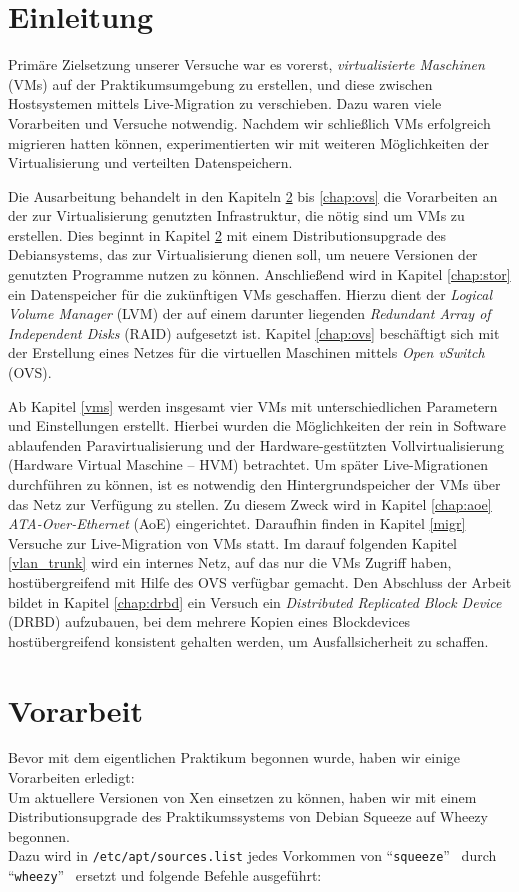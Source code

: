 \chapter{Einleitung}

Primäre Zielsetzung unserer Versuche war es vorerst, \emph{virtualisierte
Maschinen} (VMs) auf der Praktikumsumgebung zu erstellen, und diese
zwischen Hostsystemen mittels Live-Migration zu verschieben. Dazu waren viele
Vorarbeiten und Versuche notwendig. Nachdem wir schließlich VMs erfolgreich migrieren hatten können, experimentierten wir mit
weiteren Möglichkeiten der Virtualisierung und verteilten Datenspeichern.

Die Ausarbeitung behandelt in den Kapiteln \ref{chap:whezzy_ugprade} bis \ref{chap:ovs} die Vorarbeiten
an der zur Virtualisierung genutzten Infrastruktur, die nötig sind um VMs zu erstellen.
Dies beginnt in Kapitel \ref{chap:whezzy_ugprade} mit einem Distributionsupgrade des Debiansystems, 
das zur Virtualisierung dienen soll, um neuere Versionen der genutzten Programme nutzen zu können. Anschließend wird in Kapitel \ref{chap:stor} ein Datenspeicher für die zukünftigen VMs geschaffen. Hierzu dient der \emph{Logical Volume Manager} (LVM) der auf einem darunter liegenden \emph{Redundant Array of Independent Disks} (RAID) aufgesetzt ist. Kapitel \ref{chap:ovs} beschäftigt sich mit der Erstellung eines Netzes für die virtuellen Maschinen mittels \emph{Open vSwitch} (OVS).

Ab Kapitel \ref{vms} werden insgesamt vier VMs mit unterschiedlichen
Parametern und Einstellungen erstellt. Hierbei wurden die Möglichkeiten der rein in Software ablaufenden Paravirtualisierung und der Hardware-gestützten Vollvirtualisierung (Hardware Virtual Maschine -- HVM) betrachtet. Um später Live-Migrationen durchführen zu können, ist es notwendig den Hintergrundspeicher der VMs über das Netz zur Verfügung zu stellen. Zu diesem Zweck wird in Kapitel \ref{chap:aoe} \emph{ATA-Over-Ethernet} (AoE) eingerichtet. Daraufhin finden in Kapitel \ref{migr} Versuche zur Live-Migration von VMs statt. Im darauf folgenden Kapitel \ref{vlan_trunk} wird ein internes Netz, auf das nur die VMs Zugriff haben, hostübergreifend mit Hilfe des OVS verfügbar gemacht. Den Abschluss der Arbeit bildet in Kapitel \ref{chap:drbd} ein Versuch ein \emph{Distributed Replicated Block Device} (DRBD) aufzubauen, bei dem mehrere Kopien eines Blockdevices hostübergreifend konsistent gehalten werden, um Ausfallsicherheit zu schaffen.

\chapter{Vorarbeit}
\label{chap:whezzy_ugprade}
Bevor mit dem eigentlichen Praktikum begonnen wurde, haben wir einige Vorarbeiten erledigt: \\ 
Um aktuellere Versionen von Xen einsetzen zu können, haben wir mit einem Distributionsupgrade des Praktikumssystems von Debian Squeeze auf Wheezy begonnen. \\ 
Dazu wird in \verb#/etc/apt/sources.list# jedes Vorkommen von \textquotedblleft\verb#squeeze#\textquotedblright ~ durch \textquotedblleft\verb#wheezy#\textquotedblright ~ ersetzt und folgende Befehle ausgeführt: 

